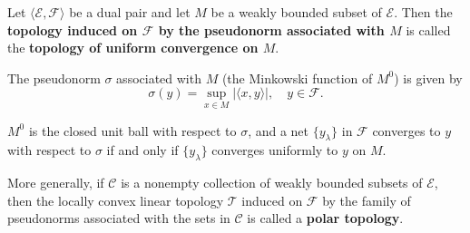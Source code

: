 Let $\langle \mathcal{E}, \mathcal{F} \rangle$ be a dual pair and let $M$ be a weakly bounded subset of $\mathcal{E}$. Then the \textbf{topology induced on $\mathcal{F}$ by the pseudonorm associated with $M$} is called the \textbf{topology of uniform convergence on $M$}.

The pseudonorm $\sigma$ associated with $M$ (the Minkowski function of $M^0$) is given by
$$\sigma(y) = \sup_{x \in M} |\langle x, y \rangle|, \quad y \in \mathcal{F}.$$

$M^0$ is the closed unit ball with respect to $\sigma$, and a net $\{y_\lambda\}$ in $\mathcal{F}$ converges to $y$ with respect to $\sigma$ if and only if $\{y_\lambda\}$ converges uniformly to $y$ on $M$.

More generally, if $\mathcal{C}$ is a nonempty collection of weakly bounded subsets of $\mathcal{E}$, then the locally convex linear topology $\mathcal{T}$ induced on $\mathcal{F}$ by the family of pseudonorms associated with the sets in $\mathcal{C}$ is called a \textbf{polar topology}.
